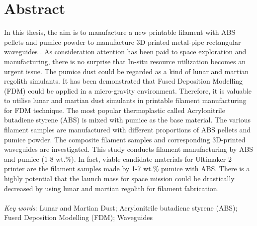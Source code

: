 \renewcommand{\baselinestretch}{1.5}
\chapter{Abstract}
\renewcommand{\baselinestretch}{\mystretch}


In this thesis, the aim is to manufacture a new printable filament with ABS pellets and pumice powder to manufacture 3D printed metal-pipe rectangular waveguides \cite{d20153}. As consideration attention has been paid to space exploration and manufacturing, there is no surprise that In-situ resource utilization becomes an urgent issue. The pumice dust could be regarded as a kind of lunar and martian regolith simulants. It has been demonstrated that Fused Deposition Modelling (FDM) could be applied in a micro-gravity environment\cite{jakus2017robust}. Therefore, it is valuable to utilise lunar and martian dust simulants in printable filament manufacturing for FDM technique. The most popular thermoplastic called Acrylonitrile butadiene styrene (ABS) is mixed with pumice as the base material. The various filament samples are manufactured with different proportions of ABS pellets and pumice powder. The composite filament samples and corresponding 3D-printed waveguides are investigated. This study conducts filament manufacturing by ABS and pumice (1-8 wt.\%). In fact, viable candidate materials for Ultimaker 2 printer are the filament samples made by 1-7 wt.\% pumice with ABS. There is a highly potential that the launch mass for space mission could be drastically decreased by using lunar and martian regolith for filament fabrication.\\
\\
\textit{Key words}: Lunar and Martian Dust; Acrylonitrile butadiene styrene (ABS); Fused Deposition Modelling (FDM); Waveguides








